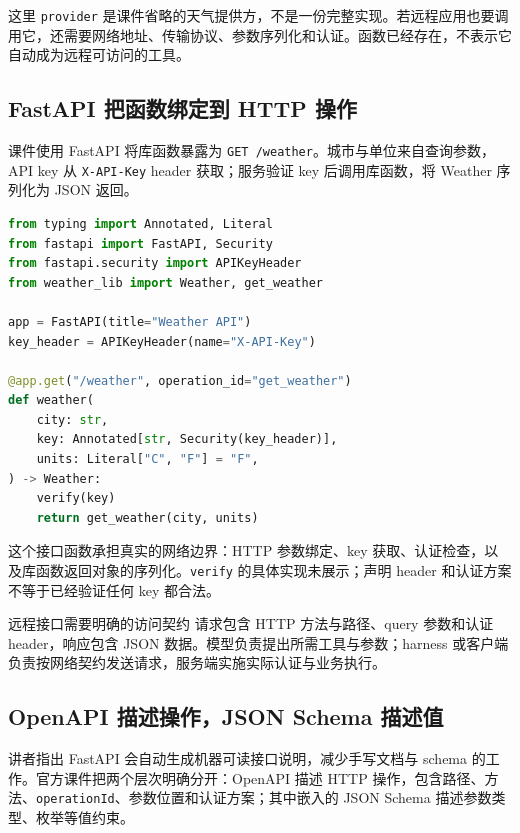 \documentclass[11pt,a4paper]{article}
\begin{document}
这里 \texttt{provider} 是课件省略的天气提供方，不是一份完整实现。若远程应用也要调用它，还需要网络地址、传输协议、参数序列化和认证。函数已经存在，不表示它自动成为远程可访问的工具。

\subsection{FastAPI 把函数绑定到 HTTP 操作}
课件使用 FastAPI 将库函数暴露为 \texttt{GET /weather}。城市与单位来自查询参数，API key 从 \texttt{X-API-Key} header 获取；服务验证 key 后调用库函数，将 Weather 序列化为 JSON 返回。

\noindent\begin{minipage}{\textwidth}
\begin{lstlisting}[caption={课件节选：天气函数对应的 REST endpoint},language=Python]
from typing import Annotated, Literal
from fastapi import FastAPI, Security
from fastapi.security import APIKeyHeader
from weather_lib import Weather, get_weather

app = FastAPI(title="Weather API")
key_header = APIKeyHeader(name="X-API-Key")

@app.get("/weather", operation_id="get_weather")
def weather(
    city: str,
    key: Annotated[str, Security(key_header)],
    units: Literal["C", "F"] = "F",
) -> Weather:
    verify(key)
    return get_weather(city, units)
\end{lstlisting}
\end{minipage}

这个接口函数承担真实的网络边界：HTTP 参数绑定、key 获取、认证检查，以及库函数返回对象的序列化。\texttt{verify} 的具体实现未展示；声明 header 和认证方案不等于已经验证任何 key 都合法。

\begin{importantbox}{远程接口需要明确的访问契约}
请求包含 HTTP 方法与路径、query 参数和认证 header，响应包含 JSON 数据。模型负责提出所需工具与参数；harness 或客户端负责按网络契约发送请求，服务端实施实际认证与业务执行。
\end{importantbox}

\subsection{OpenAPI 描述操作，JSON Schema 描述值}
讲者指出 FastAPI 会自动生成机器可读接口说明，减少手写文档与 schema 的工作。官方课件把两个层次明确分开：OpenAPI 描述 HTTP 操作，包含路径、方法、\texttt{operationId}、参数位置和认证方案；其中嵌入的 JSON Schema 描述参数类型、枚举等值约束。
\end{document}
